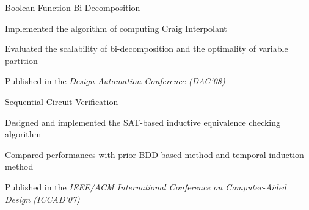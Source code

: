 \documentclass[11pt, letterpaper]{article}
\newenvironment{myexp}{
  \begin{list}{}{
      \setlength{\itemindent}{-0.15in}
      \setlength{\leftmargin}{0.3in}
      \addtolength{\topsep}{-0.1in}
    }
}{\end{list}}
\newenvironment{mybullet}{
  \begin{list}{\labelitemi}{
      \setlength{\itemindent}{0in}
      \setlength{\leftmargin}{0.15in}
      \setlength{\topsep}{0.02in}
      \setlength{\partopsep}{0pt}
    }
}{\end{list}}
\begin{document}
\begin{myexp}
\begin{myexp}
    \item Boolean Function Bi-Decomposition
    \begin{mybullet}
    \item Implemented the algorithm of computing Craig Interpolant
    \item Evaluated the scalability of bi-decomposition and the optimality of variable partition
    \item Published in the {\it Design Automation Conference (DAC'08)}
    \end{mybullet}
   
    
    \item Sequential Circuit Verification
    \begin{mybullet}
    \item Designed and implemented the SAT-based inductive equivalence checking algorithm
    \item Compared performances with prior BDD-based method and temporal induction method
    \item Published in the {\it IEEE/ACM International Conference on Computer-Aided Design (ICCAD'07)}\\
    \end{mybullet}
    
  \end{myexp}


\end{myexp}
\end{document}
